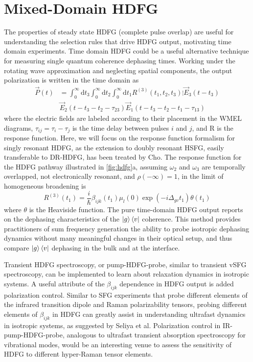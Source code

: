 \documentclass[aip, jcp, reprint, onecolumn]{revtex4-2}
\begin{document}
\section{Mixed-Domain HDFG}\label{mixeddomain}
The properties of steady state HDFG (complete pulse overlap) are useful for understanding the selection rules that drive HDFG output, motivating time domain experiments.
Time domain HDFG could be a useful alternative technique for measuring single quantum coherence dephasing times.
Working under the rotating wave approximation and neglecting spatial components, the output polarization is written in the time domain as 
\begin{equation}
	\begin{split}
			\vec{P}(t) &= \int_0^\infty \mathrm{d}t_3 \int_0^\infty \mathrm{d}t_2 \int_0^\infty \mathrm{d}t_1 R^{(3)}(t_1, t_2, t_3)  \vdots \vec{E}_3(t-t_3) \\
			&\vec{E}_2(t-t_3-t_2 - \tau_{23}) \vec{E}_1(t-t_3-t_2-t_1 - \tau_{13}) 
	\end{split}
\end{equation}
where the electric fields are labeled according to their placement in the WMEL diagrams, $\tau_{ij} = \tau_i - \tau_j$ is the time delay between pulses $i$ and $j$, and R is the response function. \cite{RN287} 
Here, we will focus on the response function formalism for singly resonant HDFG, as the extension to doubly resonant HSFG, easily transferable to DR-HDFG, has been treated by Cho. \cite{Cho2001}
The response function for the HDFG pathway illustrated in \autoref{fig:hdfg}a, assuming $\omega_2$ and $\omega_3$ are temporally overlapped, not electronically resonant, and $\rho(-\infty) = 1$, in the limit of homogeneous broadening is \cite{Cho2001, Meyer2004, RN367}
\begin{equation}
	R^{(3)}(t_1) = \frac{i}{\hbar} \beta_{ijk}(t_1) \mu_l(0) \exp(-i\Delta_{gv}t_1) \theta(t_1) 
\end{equation}  
where $\theta$ is the Heaviside function.
The pure time-domain HDFG output reports on the dephasing characteristics of the $\ket{g}\bra{v}$ coherence. 
This method provides practitioners of sum frequency generation the ability to probe isotropic dephasing dynamics without many meaningful changes in their optical setup, and thus compare $\ket{g}\bra{v}$ dephasing in the bulk and at the interface.\cite{RN224}

Transient HDFG spectroscopy, or pump-HDFG-probe, similar to transient vSFG spectroscopy, can be implemented to learn about relaxation dynamics in isotropic systems. \cite{RN224, Bonn2024}
A useful attribute of the $\beta_{ijk}$ dependence in HDFG output is added polarization control. 
Similar to SFG experiments that probe different elements of the infrared transition dipole and Raman polarizability tensors, probing different elements of $\beta_{ijk}$ in HDFG can greatly assist in understanding ultrafast dynamics in isotropic systems, as suggested by Seliya et al. \cite{Shen90, RN224, Bonn2024}
Polarization control in IR-pump-HDFG-probe, analogous to ultrafast transient absorption spectroscopy for vibrational modes, would be an interesting venue to assess the sensitivity of HDFG to different hyper-Raman tensor elements. 
\end{document}
